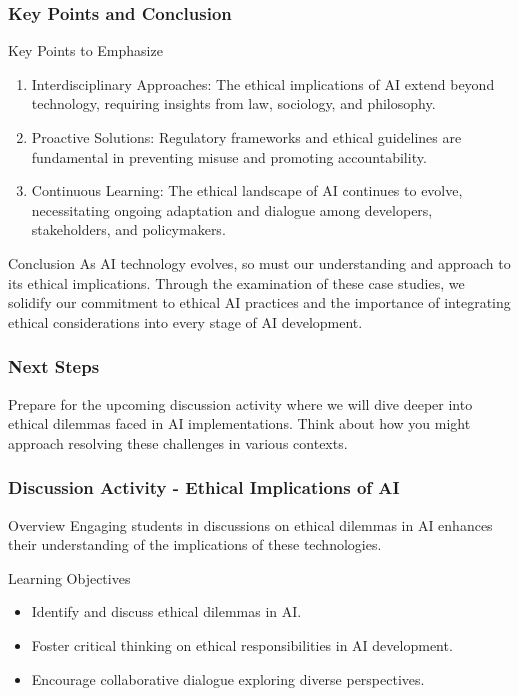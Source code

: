 \documentclass[aspectratio=169]{beamer}
\begin{document}
\begin{frame}[fragile]
    \frametitle{Key Points and Conclusion}
    \begin{block}{Key Points to Emphasize}
        \begin{enumerate}
            \item Interdisciplinary Approaches: The ethical implications of AI extend beyond technology, requiring insights from law, sociology, and philosophy.
            \item Proactive Solutions: Regulatory frameworks and ethical guidelines are fundamental in preventing misuse and promoting accountability.
            \item Continuous Learning: The ethical landscape of AI continues to evolve, necessitating ongoing adaptation and dialogue among developers, stakeholders, and policymakers.
        \end{enumerate}
    \end{block}
    \begin{block}{Conclusion}
        As AI technology evolves, so must our understanding and approach to its ethical implications. Through the examination of these case studies, we solidify our commitment to ethical AI practices and the importance of integrating ethical considerations into every stage of AI development.
    \end{block}
\end{frame}

\begin{frame}[fragile]
    \frametitle{Next Steps}
    Prepare for the upcoming discussion activity where we will dive deeper into ethical dilemmas faced in AI implementations. Think about how you might approach resolving these challenges in various contexts.
\end{frame}

\begin{frame}[fragile]
    \frametitle{Discussion Activity - Ethical Implications of AI}
    \begin{block}{Overview}
        Engaging students in discussions on ethical dilemmas in AI enhances their understanding of the implications of these technologies.
    \end{block}
    
    \begin{block}{Learning Objectives}
        \begin{itemize}
            \item Identify and discuss ethical dilemmas in AI.
            \item Foster critical thinking on ethical responsibilities in AI development.
            \item Encourage collaborative dialogue exploring diverse perspectives.
        \end{itemize}
    \end{block}
\end{frame}
\end{document}
